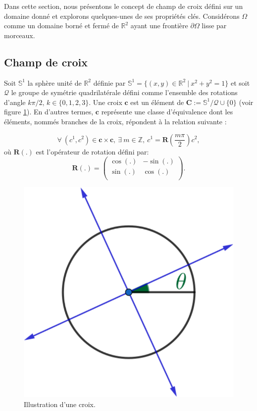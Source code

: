 Dans cette section, nous présentons le concept de champ de croix défini sur un domaine donné et explorons quelques-unes de ses propriétés clés. Considérons $\Omega$ comme un domaine borné et fermé de $\mathbb{R}^2$ ayant une frontière $\partial\Omega$ lisse par morceaux.

\subsection{Champ de croix}

Soit $\mathbb{S}^1$ la sphère unité de $\mathbb{R}^2$ définie par $\mathbb{S}^1=\{(x,y)\in\mathbb{R}^2~|~x^2+y^2=1\}$ et soit $\mathcal{Q}$ le groupe de symétrie quadrilatérale défini comme l'ensemble des rotations d'angle $k\pi/2$, $k\in\{0, 1, 2, 3\}$. Une croix $\mathbf{c}$ est un élément de $\mathbf{C}:=\mathbb{S}^1/\mathcal{Q}\cup\{0\}$ \cite{beaufort2017computing} (voir figure \ref{fig:croix}). En d'autres termes, $\mathbf{c}$ représente une classe d'équivalence dont les éléments, nommés branches de la croix, répondent à la relation suivante :

\begin{equation}
\label{eq:croix}
\forall~(c^1, c^2)\in\mathbf{c}\times\mathbf{c},~\exists~m\in\mathbb{Z},~c^1=\mathbf{R}\left(\frac{m\pi}{2}\right)c^2,
\end{equation}
où $\mathbf{R}(.)$ est l'opérateur de rotation défini par:
\begin{equation}
\label{eq:matricerotation}
\mathbf{R}(.)=
\begin{pmatrix}
\cos(.) & -\sin(.) \\
\sin(.) & \cos(.) \\
\end{pmatrix}.
\end{equation}

\begin{figure}[!h]
  \centering
  \includegraphics[scale=0.5]{images/cross.pdf}
  \caption{Illustration d'une croix.}
  \label{fig:croix}
\end{figure}

